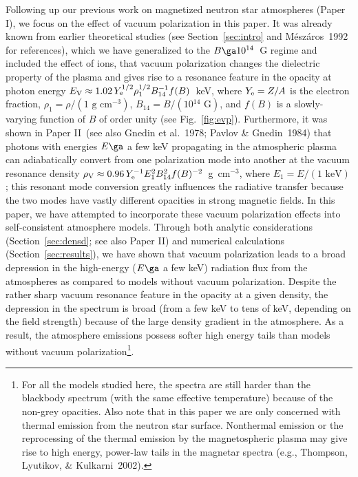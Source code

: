 \documentclass{mn2e}
\newcommand{\etal}{et al.}
\newcommand{\Ye}{Y_{\rm e}}
\newcommand{\Evp}{E_{\rm V}}
\newcommand{\densvp}{\rho_{\rm V}}
\newcommand{\holai}{Paper I}
\newcommand{\laiho}{Paper II}
\begin{document}
{{Following up our previous work
on magnetized neutron star atmospheres (\holai), we focus on
the effect of vacuum polarization in this paper.  It was already
known from earlier theoretical studies (see Section~\ref{sec:intro}
and M\'{e}sz\'{a}ros~1992 for references), which we have generalized
to the $B\ga 10^{14}$~G regime and included the effect of ions,
that vacuum polarization changes the dielectric property of the plasma
and gives rise to a resonance feature in the opacity at photon energy
$\Evp\approx 1.02\,\Ye^{1/2}\rho_1^{1/2}B_{14}^{-1}f(B)$~keV, where
$\Ye=Z/A$ is the electron fraction,
$\rho_1=\rho/(\mbox{1 g cm$^{-3}$})$, $B_{14}=B/(\mbox{10$^{14}$ G})$,
and  $f(B)$ is a slowly-varying function of $B$ of order unity
(see Fig.~\ref{fig:evp}).
Furthermore, it was shown in \laiho\ (see also Gnedin \etal~1978;
Pavlov \& Gnedin~1984) that photons
with energies $E\ga$ a few keV propagating in the atmospheric plasma
can adiabatically convert from one polarization mode into another
at the vacuum resonance density
$\densvp\approx 0.96\,\Ye^{-1}E_1^2B_{14}^2f(B)^{-2}$~g~cm$^{-3}$,
where $E_1=E/(\mbox{1 keV})$;
this resonant mode conversion greatly influences the radiative transfer
because the two modes have vastly different opacities in strong magnetic
fields. In this paper, we have attempted to incorporate these vacuum
polarization effects into self-consistent atmosphere models.
Through both analytic considerations (Section~\ref{sec:densd};
see also \laiho) and numerical calculations (Section~\ref{sec:results}),
we have shown that vacuum polarization leads to
a broad depression in the high-energy ($E\ga$ a few keV)
radiation flux from the atmospheres as compared to models
without vacuum polarization.  Despite the rather sharp
vacuum resonance feature in the opacity at a given density,
the depression in the spectrum is broad (from a few keV to tens of keV,
depending on the field strength) because of the large density gradient
in the atmosphere.
As a result, the atmosphere emissions possess
softer high energy tails than models without vacuum polarization\footnote{
For all the models studied here, the spectra are still harder than the
blackbody spectrum (with the same effective temperature) because of
the non-grey opacities.  Also note that in this paper we are only
concerned with thermal emission from the neutron star surface.
Nonthermal emission or the reprocessing of the thermal emission
by the magnetospheric plasma may give rise to high energy, power-law
tails in the magnetar spectra (e.g., Thompson, Lyutikov, \& Kulkarni~2002).}.

}}
\end{document}
